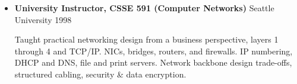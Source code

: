 \begin{itemize}
    \vspace{-3mm}
	\item \textbf{University Instructor, CSSE 591 (Computer Networks)} \hfill Seattle University \hfill 1998
        \vspace{-2mm}
        \begin{myquote}
            Taught practical networking design from a business perspective, layers
            1 through 4 and TCP/IP. NICs, bridges, routers, and firewalls.
            IP numbering, DHCP and DNS, file and print servers. Network
            backbone design trade-offs, structured cabling, security \& data
            encryption.
        \end{myquote}
\end{itemize}
\vspace{-1mm}
